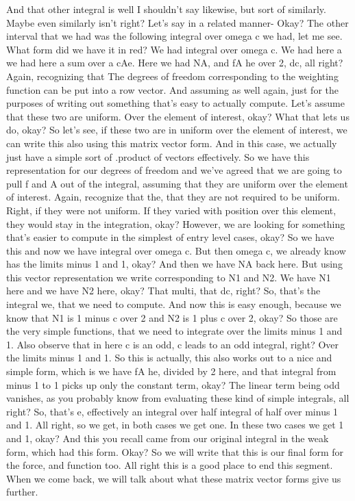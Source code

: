 \documentclass[10pt]{article}
\begin{document}
And that other integral is well I shouldn't say likewise, but sort of similarly. Maybe even similarly isn't right? Let's say in a related manner- Okay? The other interval that we had was the following integral over omega c we had, let me see. What form did we have it in red? We had integral over omega c. We had here a we had here a sum over a cAe. Here we had NA, and fA he over 2, dc, all right? Again, recognizing that The degrees of freedom corresponding to the weighting function can be put into a row vector. And assuming as well again, just for the purposes of writing out something that's easy to actually compute. Let's assume that these two are uniform. Over the element of interest, okay? What that lets us do, okay? So let's see, if these two are in uniform over the element of interest, we can write this also using this matrix vector form. And in this case, we actually just have a simple sort of .product of vectors effectively. So we have this representation for our degrees of freedom and we've agreed that we are going to pull f and A out of the integral, assuming that they are uniform over the element of interest. Again, recognize that the, that they are not required to be uniform. Right, if they were not uniform. If they varied with position over this element, they would stay in the integration, okay? However, we are looking for something that's easier to compute in the simplest of entry level cases, okay? So we have this and now we have integral over omega c. But then omega c, we already know has the limits minus 1 and 1, okay? And then we have NA back here. But using this vector representation we write corresponding to N1 and N2. We have N1 here and we have N2 here, okay? That multi, that dc, right? So, that's the integral we, that we need to compute. And now this is easy enough, because we know that N1 is 1 minus c over 2 and N2 is 1 plus c over 2, okay? So those are the very simple functions, that we need to integrate over the limits minus 1 and 1. Also observe that in here c is an odd, c leads to an odd integral, right? Over the limits minus 1 and 1. So this is actually, this also works out to a nice and simple form, which is we have fA he, divided by 2 here, and that integral from minus 1 to 1 picks up only the constant term, okay? The linear term being odd vanishes, as you probably know from evaluating these kind of simple integrals, all right? So, that's e, effectively an integral over half integral of half over minus 1 and 1. All right, so we get, in both cases we get one. In these two cases we get 1 and 1, okay? And this you recall came from our original integral in the weak form, which had this form. Okay? So we will write that this is our final form for the force, and function too. All right this is a good place to end this segment. When we come back, we will talk about what these matrix vector forms give us further.
\end{document}

